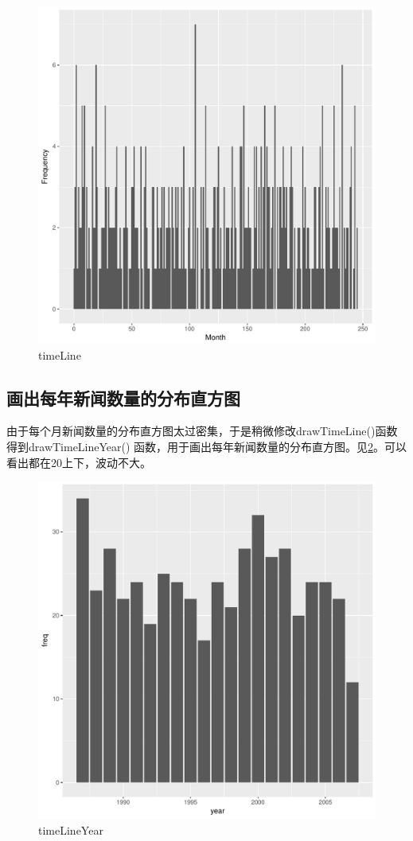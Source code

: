 \documentclass[12pt]{article}
\begin{document}
\begin{figure}[htbp]
\centering
\includegraphics[width=1.0\textwidth]{../result/timeLine.pdf}
\caption{timeLine}
\label{fig:timeLine}
\end{figure}

\subsection{画出每年新闻数量的分布直方图}
由于每个月新闻数量的分布直方图太过密集，于是稍微修改drawTimeLine()函数得到drawTimeLineYear()
函数，用于画出每年新闻数量的分布直方图。见\ref{fig:timeLineYear}。可以看出都在20上下，波动不大。
\begin{figure}[htbp]
\centering
\includegraphics[width=1.0\textwidth]{../result/timeLineYear.pdf}
\caption{timeLineYear}
\label{fig:timeLineYear}
\end{figure}
\end{document}
